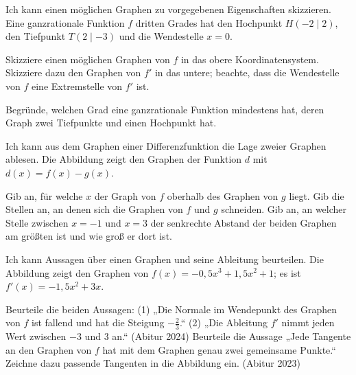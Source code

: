 \begin{aufgabe}{Ich kann einen möglichen Graphen zu vorgegebenen Eigenschaften skizzieren. Eine ganzrationale Funktion $f$ dritten Grades hat den Hochpunkt $H(-2 \mid 2)$, den Tiefpunkt $T(2 \mid -3)$ und die Wendestelle $x = 0$.}
\begin{teile}
\teil Skizziere einen möglichen Graphen von $f$ in das obere Koordinatensystem.
\teil Skizziere dazu den Graphen von $f'$ in das untere; beachte, dass die Wendestelle von $f$ eine Extremstelle von $f'$ ist.
\end{teile}


\begin{teile}
\teil Begründe, welchen Grad eine ganzrationale Funktion mindestens hat, deren Graph zwei Tiefpunkte und einen Hochpunkt hat.
\end{teile}
\end{aufgabe}

\begin{aufgabe}{Ich kann aus dem Graphen einer Differenzfunktion die Lage zweier Graphen ablesen. Die Abbildung zeigt den Graphen der Funktion $d$ mit $d(x) = f(x) - g(x)$.}

\begin{ksys}[xmin=-2,xmax=4,ymin=-3,ymax=3,ablesen]
\end{ksys}

\begin{teile}
\teil Gib an, für welche $x$ der Graph von $f$ oberhalb des Graphen von $g$ liegt. \leerfeld
\teil Gib die Stellen an, an denen sich die Graphen von $f$ und $g$ schneiden. \leerfeld
\teil Gib an, an welcher Stelle zwischen $x = -1$ und $x = 3$ der senkrechte Abstand der beiden Graphen am größten ist und wie groß er dort ist.
\end{teile}
\end{aufgabe}

\begin{aufgabe}{Ich kann Aussagen über einen Graphen und seine Ableitung beurteilen. Die Abbildung zeigt den Graphen von $f(x) = -0{,}5x^3 + 1{,}5x^2 + 1$; es ist $f'(x) = -1{,}5x^2 + 3x$.}

\begin{ksys}[xmin=-2,xmax=4,ymin=-3,ymax=5,ablesen]
\end{ksys}

\begin{teile}
\teil Beurteile die beiden Aussagen: (1) „Die Normale im Wendepunkt des Graphen von $f$ ist fallend und hat die Steigung $-\frac{2}{3}$.“ (2) „Die Ableitung $f'$ nimmt jeden Wert zwischen $-3$ und $3$ an.“ (Abitur 2024)
\teil Beurteile die Aussage „Jede Tangente an den Graphen von $f$ hat mit dem Graphen genau zwei gemeinsame Punkte.“ Zeichne dazu passende Tangenten in die Abbildung ein. (Abitur 2023)
\end{teile}
\end{aufgabe}

